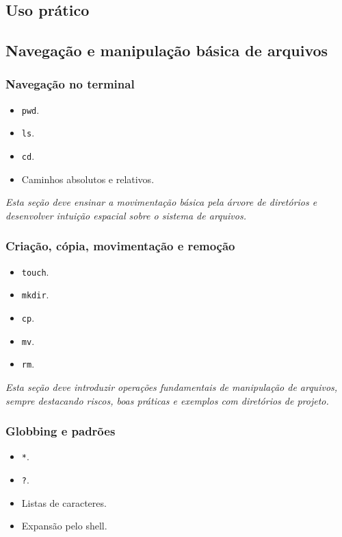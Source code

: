 \documentclass[12pt,openany]{book}
\newcommand{\placeholder}[1]{
    \par\medskip
    \noindent\textit{#1}
    \par\medskip
}
\newcommand{\topicos}[1]{
    \begin{itemize}
        #1
    \end{itemize}
}
\begin{document}

\begin{refsection}
\part{Uso prático}

\chapter{Navegação e manipulação básica de arquivos}

\section{Navegação no terminal}

\topicos{
    \item \texttt{pwd}.
    \item \texttt{ls}.
    \item \texttt{cd}.
    \item Caminhos absolutos e relativos.
}

\placeholder{Esta seção deve ensinar a movimentação básica pela árvore de diretórios e desenvolver intuição espacial sobre o sistema de arquivos.}

\section{Criação, cópia, movimentação e remoção}

\topicos{
    \item \texttt{touch}.
    \item \texttt{mkdir}.
    \item \texttt{cp}.
    \item \texttt{mv}.
    \item \texttt{rm}.
}

\placeholder{Esta seção deve introduzir operações fundamentais de manipulação de arquivos, sempre destacando riscos, boas práticas e exemplos com diretórios de projeto.}

\section{Globbing e padrões}

\topicos{
    \item \texttt{*}.
    \item \texttt{?}.
    \item Listas de caracteres.
    \item Expansão pelo shell.
}


\end{refsection}
\end{document}
